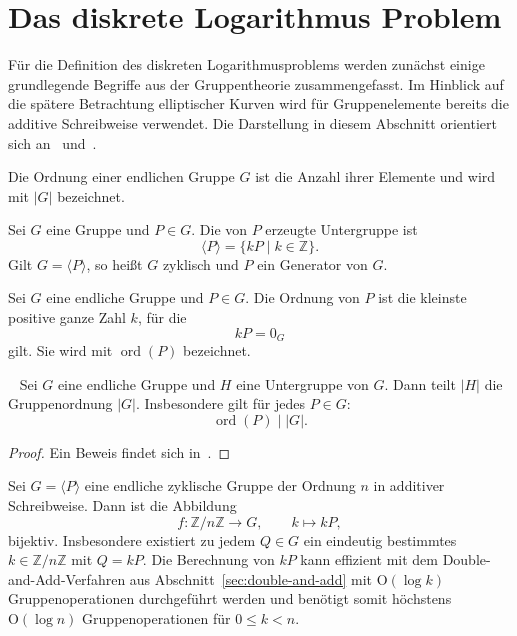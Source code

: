 \section{Das diskrete Logarithmus Problem}
Für die Definition des diskreten Logarithmusproblems werden zunächst einige grundlegende Begriffe aus der Gruppentheorie zusammengefasst. Im Hinblick auf die spätere Betrachtung elliptischer Kurven wird für Gruppenelemente bereits die additive Schreibweise verwendet.
Die Darstellung in diesem Abschnitt orientiert sich an~\cite[S.~200]{buell24} und~\cite[S.~34--36]{karpf24}.
\begin{definition}[Gruppenordnung]
    Die Ordnung einer endlichen Gruppe $G$ ist die Anzahl
    ihrer Elemente und wird mit $|G|$ bezeichnet.
\end{definition}
\begin{definition}
    Sei $G$ eine Gruppe und $P\in G$. Die von $P$ erzeugte
    Untergruppe ist
    \[
        \langle P\rangle=\{kP\mid k\in\mathbb{Z}\}.
    \]
    Gilt $G=\langle P\rangle$, so heißt $G$ zyklisch
    und $P$ ein Generator von $G$.
\end{definition}
\begin{definition}[Elementordnung]
    Sei $G$ eine endliche Gruppe und $P\in G$.
    Die Ordnung von $P$ ist die kleinste positive
    ganze Zahl $k$, für die
    \[
        kP=0_G
    \]
    gilt. Sie wird mit $\operatorname{ord}(P)$ bezeichnet.
\end{definition}
\begin{satz}~\label{satz:lagrange}
    Sei $G$ eine endliche Gruppe und $H$ eine Untergruppe
    von $G$. Dann teilt $|H|$ die Gruppenordnung $|G|$.
    Insbesondere gilt für jedes $P\in G$:
    \[
        \operatorname{ord}(P)\mid |G|.
    \]
\end{satz}
\begin{proof}
    Ein Beweis findet sich in~\cite[~S.44]{karpf24}.
\end{proof}
Sei $G=\langle P\rangle$ eine endliche zyklische Gruppe der Ordnung $n$ in additiver Schreibweise. Dann ist die Abbildung
\[
    f:\mathbb{Z}/n\mathbb{Z}\longrightarrow G,
    \qquad k\longmapsto kP,
\]
bijektiv. Insbesondere existiert zu jedem $Q\in G$ ein eindeutig bestimmtes $k\in\mathbb{Z}/n\mathbb{Z}$ mit $Q=kP$. Die Berechnung von $kP$ kann effizient mit dem Double-and-Add-Verfahren aus Abschnitt~\ref{sec:double-and-add} mit $\mathrm O(\log k)$ Gruppenoperationen durchgeführt werden und benötigt somit höchstens $\mathrm O(\log n)$ Gruppenoperationen für $0\leq k<n$.


